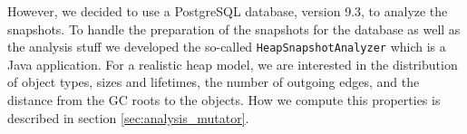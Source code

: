 However, we decided to use a PostgreSQL \cite{PSQL} database, version 9.3, to analyze the snapshots. To handle the preparation of the snapshots for the database as well as the analysis stuff we developed the so-called \texttt{HeapSnapshotAnalyzer} which is a Java application. For a realistic heap model, we are interested in the distribution of object types, sizes and lifetimes, the number of outgoing edges, and the distance from the GC roots to the objects. How we compute this properties is described in section \ref{sec:analysis_mutator}.
